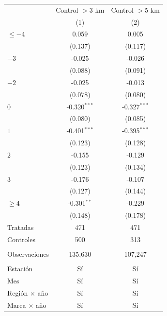 
\begingroup
\centering
\begin{tabular}{lcc}
   \toprule
                        & Control $>$3 km & Control $>$5 km \\   
                        & (1)             & (2)\\  
   \midrule 
   $\leq -4$            & 0.059           & 0.005\\   
                        & (0.137)         & (0.117)\\   
   $-3$                 & -0.025          & -0.026\\   
                        & (0.088)         & (0.091)\\   
   $-2$                 & -0.025          & -0.013\\   
                        & (0.078)         & (0.080)\\   
   $0$                  & -0.320$^{***}$  & -0.327$^{***}$\\   
                        & (0.080)         & (0.085)\\   
   $1$                  & -0.401$^{***}$  & -0.395$^{***}$\\   
                        & (0.123)         & (0.128)\\   
   $2$                  & -0.155          & -0.129\\   
                        & (0.123)         & (0.134)\\   
   $3$                  & -0.176          & -0.107\\   
                        & (0.127)         & (0.144)\\   
   $\geq 4$             & -0.301$^{**}$   & -0.229\\   
                        & (0.148)         & (0.178)\\   
   Tratadas             & 471             & 471\\  
   Controles            & 500             & 313\\  
    \\
   Observaciones        & 135,630         & 107,247\\  
    \\
   Estación             & Sí              & Sí\\  
   Mes                  & Sí              & Sí\\  
   Región $\times$ año  & Sí              & Sí\\  
   Marca $\times$ año   & Sí              & Sí\\  
   \bottomrule
\end{tabular}
\par\endgroup


